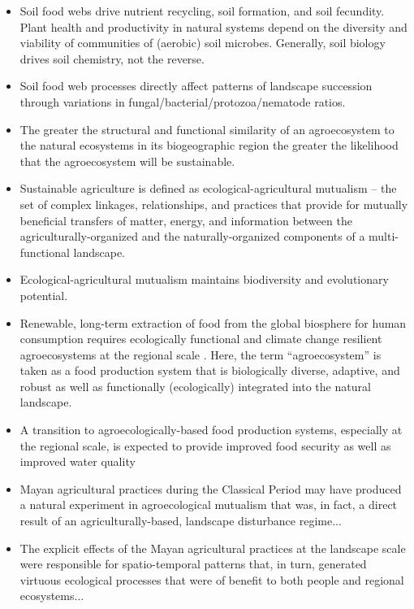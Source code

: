 \begin{itemize}
 \item Soil food webs drive nutrient recycling, soil formation, and soil fecundity. Plant health and productivity in natural systems depend on the diversity and viability of communities of (aerobic) soil microbes. Generally, soil biology drives soil chemistry, not the reverse.
 
  \item Soil food web processes directly affect patterns of landscape succession through variations in fungal/bacterial/protozoa/nematode ratios.
  
  \item The greater the structural and functional similarity of an agroecosystem to the natural ecosystems in its biogeographic region the greater the likelihood that the agroecosystem will be sustainable. 
  
  \item Sustainable agriculture is defined as ecological-agricultural mutualism -- the set of complex linkages, relationships, and practices that provide for mutually beneficial transfers of matter, energy, and information between the agriculturally-organized and the naturally-organized components of a multi-functional landscape. 
  
  \item Ecological-agricultural mutualism maintains biodiversity and evolutionary potential.
  
  \item Renewable, long-term extraction of food from the global biosphere for human consumption requires ecologically functional and climate change resilient agroecosystems at the regional scale \citep{barnosky_approaching_2012}.  Here, the term \enquote{agroecosystem} is taken as a food production system that is biologically diverse, adaptive, and robust as well as functionally (ecologically) integrated into the natural landscape.
  
  \item A transition to agroecologically-based food production systems, especially at the regional scale, is expected to provide improved food security as well as improved water quality \citep{godfray_food_2010, schmidhuber_global_2007} 
  
  \item Mayan agricultural practices during the Classical Period may have produced a natural experiment in agroecological mutualism that was, in fact, a direct result of an agriculturally-based, landscape disturbance regime...
  
  \item The explicit effects of the Mayan agricultural practices at the landscape scale were responsible for spatio-temporal patterns that, in turn, generated virtuous ecological processes that were of benefit to both people and regional ecosystems...

\end{itemize}



